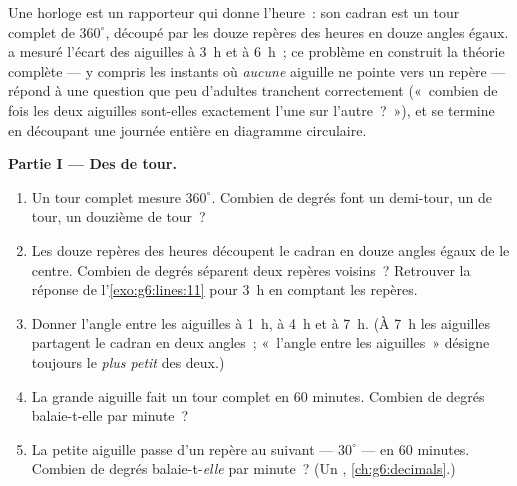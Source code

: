 \begin{problem}
\label{pb:g6:lines:1}
Une horloge est un rapporteur qui donne l'heure~: son cadran est un
tour complet de $360^\circ$, découpé par les douze repères des heures
en douze angles égaux.  a mesuré l'écart des
aiguilles à 3~h et à 6~h~; ce problème en construit la théorie
complète --- y compris les instants où \emph{aucune} aiguille ne
pointe vers un repère --- répond à une question que peu d'adultes
tranchent correctement («~combien de fois les deux aiguilles sont-elles
exactement l'une sur l'autre~?~»), et se termine en découpant une
journée entière en diagramme circulaire.

\medskip
\noindent\textbf{Partie I --- Des  de tour.}
\begin{enumerate}
  \item Un tour complet mesure $360^\circ$. Combien de degrés font un
        demi-tour, un  de tour, un douzième de tour~?
  \item Les douze repères des heures découpent le cadran en douze
        angles égaux de  le centre. Combien de degrés séparent
        deux repères voisins~? Retrouver la réponse de
        l'\cref{exo:g6:lines:11} pour 3~h en comptant les repères.
  \item Donner l'angle entre les aiguilles à 1~h, à 4~h et à 7~h. (À
        7~h les aiguilles partagent le cadran en deux angles~;
        «~l'angle entre les aiguilles~» désigne toujours le
        \emph{plus petit} des deux.)
  \item La grande aiguille fait un tour complet en $60$ minutes.
        Combien de degrés balaie-t-elle par minute~?
  \item La petite aiguille passe d'un repère au suivant ---
        $30^\circ$ --- en $60$ minutes. Combien de degrés
        balaie-t-\emph{elle} par minute~? (Un ,
        \cref{ch:g6:decimals}.)
\end{enumerate}


\end{problem}
